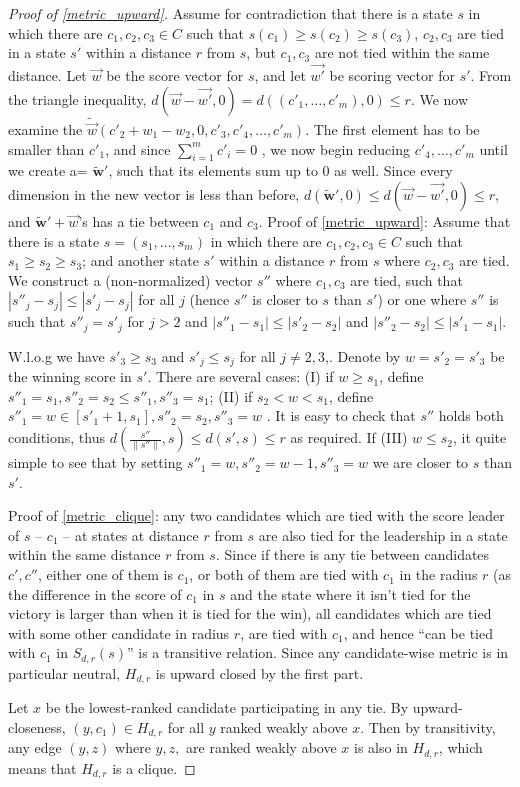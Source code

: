 \documentclass[letterpaper]{article} %
\begin{document}
\begin{proof}[Proof of \ref{metric_upward}]
Assume for contradiction that there is a state $s$ in which there are $c_1,c_{2},c_{3}\in C$ such that $s(c_{1})\geq s(c_{2})\geq s(c_{3})$, $c_2,c_3$ are tied in a state $s'$ within a distance $r$ from $s$, but $c_{1},c_{3}$ are not tied within the same distance. Let $\vec{w}$ be the score vector for $s$, and let $\vec{w'}$ be scoring vector for $s'$. From the triangle inequality, $d(\vec{w}-\vec{w'},0)=d((c'_{1},\ldots,c'_{m}),0)\leq r$. We now examine the $\tilde{\vec{w}}(c'_{2}+w_{1}-w_{2},0,c'_{3},c'_{4},\ldots,c'_{m})$. The first element has to be smaller than $c'_{1}$, and since $\sum_{i=1}^{m}c'_{i}=0$	, we now begin reducing $c'_{4},\ldots,c'_{m}$ until we create a= $\boldsymbol{\tilde{w}'}$, such that its elements sum up to $0$ as well. Since every dimension in the new vector is less than before, $d(\boldsymbol{\tilde{w}'},0)\leq d(\vec{w}-\vec{w'},0)\leq r$, and $\boldsymbol{\tilde{w}'}+\vec{w}$'s has a tie between $c_{1}$ and $c_{3}$.
Proof of \ref{metric_upward}: Assume that there is a state $s=(s_1,\ldots,s_m)$ in which there are $c_1,c_{2},c_{3}\in C$ such that $s_{1}\geq s_{2}\geq s_{3}$; and another state $s'$ within a distance $r$ from $s$ where $c_2,c_3$ are tied. We construct a (non-normalized) vector $s''$ where $c_1,c_3$ are tied, such that $|s''_j-s_j|\leq |s'_j-s_j|$ for all $j$ (hence $s''$ is closer to $s$ than $s'$) or one where $s''$ is such that $s''_{j}=s'_{j}$ for $j>2$ and $|s''_{1}-s_{1}|\leq|s'_{2}-s_{2}|$ and $|s''_{2}-s_{2}|\leq |s'_{1}-s_{1}|$.

W.l.o.g we have $s'_3\geq s_3$ and $s'_j\leq s_j$ for all $j\neq 2,3$,. Denote by $w=s'_2=s'_3$ be the winning score in $s'$. There are several cases: (I) if $w\geq s_1$, define $s''_1=s_1, s''_2=s_2\leq s''_1, s''_3 = s_1$; (II) if $s_{2}<w<s_1$, define $s''_1 = w\in [s'_1+1,s_1], s''_2 = s_{2}, s''_3=w$ . It is easy to check that $s''$ holds both conditions, thus $d(\frac{s''}{\|s''\|},s)\leq d(s',s)\leq r$ as required. If (III) $w\leq s_{2}$, it quite simple to see that by setting $s''_{1}=w, s''_{2}=w-1,s''_{3}=w$ we are closer to $s$ than $s'$.

Proof of \ref{metric_clique}: any two candidates which are tied with the score leader of $s$ -- $c_{1}$ -- at states at distance $r$ from $s$ are also tied for the leadership in a state within the same distance $r$ from $s$. Since if there is any tie between candidates $c',c''$, either one of them is $c_{1}$, or both of them are tied with $c_{1}$ in the radius $r$ (as the difference in the score of $c_{1}$ in $s$ and the state where it isn't tied for the victory is larger than when it is tied for the win), all candidates which are tied with some other candidate in radius $r$, are tied with $c_{1}$, and hence ``can be tied with $c_1$ in $S_{d,r}(s)$'' is a transitive relation. Since any candidate-wise metric is in particular neutral, $H_{d,r}$ is upward closed by the first part.

Let $x$ be the lowest-ranked candidate participating in any tie. By upward-closeness, $(y,c_1)\in H_{d,r}$ for all $y$ ranked weakly above $x$. Then by transitivity, any edge $(y,z)$ where $y,z,$ are ranked weakly above $x$ is also in $H_{d,r}$, which means that $H_{d,r}$ is a clique.
 \end{proof}
\end{document}
